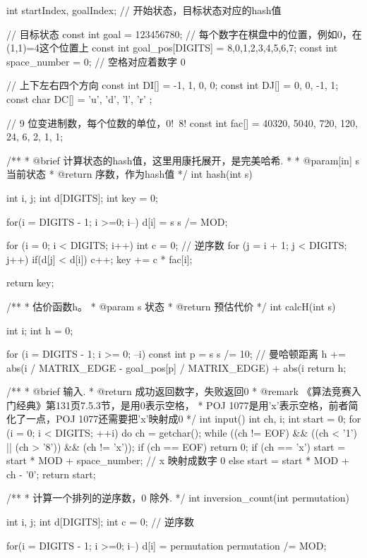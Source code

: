 \begin{Codex}[label=eight_digits_astar.c]
int  startIndex, goalIndex; // 开始状态，目标状态对应的hash值

// 目标状态
const int goal = 123456780;
// 每个数字在棋盘中的位置，例如0，在(1,1)=4这个位置上
const int goal_pos[DIGITS] = {8,0,1,2,3,4,5,6,7};
const int space_number = 0; // 空格对应着数字 0

// 上下左右四个方向
const int DI[] = {-1, 1, 0, 0};
const int DJ[] = {0, 0, -1, 1};
const char DC[] = { 'u', 'd', 'l', 'r' };

// 9 位变进制数，每个位数的单位，0!~8!
const int fac[] = {40320, 5040, 720, 120, 24, 6, 2, 1, 1};

/**
 * @brief 计算状态的hash值，这里用康托展开，是完美哈希.
 *
 * @param[in] s 当前状态
 * @return 序数，作为hash值
 */
int hash(int s) {
    int i, j;
    int d[DIGITS];
    int key = 0;

    for(i = DIGITS - 1; i >=0; i--) {
        d[i] = s %
        s /= MOD;
    }
    
    for (i = 0; i < DIGITS; i++) {
        int c = 0; // 逆序数
        for (j = i + 1; j < DIGITS; j++) {
            if(d[j] < d[i]) {
                c++;
            }
        }
        key += c * fac[i];
    }
    
    return key;
}


/**
 * 估价函数h。
 * @param s 状态
 * @return 预估代价
 */
int calcH(int s) {
    int i;
    int h = 0;
    
    for (i = DIGITS - 1; i >= 0; --i) {
        const int p = s %
        s /= 10;
        // 曼哈顿距离
        h += abs(i / MATRIX_EDGE - goal_pos[p] / MATRIX_EDGE) +
            abs(i %
    }
    return h;
}

/**
 * @brief 输入.
 * @return  成功返回数字，失败返回0
 * @remark 《算法竞赛入门经典》第131页7.5.3节，是用0表示空格，
 * POJ 1077是用'x'表示空格，前者简化了一点，POJ 1077还需要把'x'映射成0
 */
int input() {
    int ch, i;
    int start = 0;
    for (i = 0; i < DIGITS; ++i) {
        do {
            ch = getchar();
        } while ((ch != EOF) && ((ch < '1') || (ch > '8')) && (ch != 'x'));
        if (ch == EOF) return 0;
        if (ch == 'x') start = start * MOD + space_number; // x 映射成数字 0
        else             start = start * MOD + ch - '0';
    }
    return start;
}

/**
 * 计算一个排列的逆序数，0 除外.
 */
int inversion_count(int permutation) {
    int i, j;
    int d[DIGITS];
    int c = 0; // 逆序数

    for(i = DIGITS - 1; i >=0; i--) {
        d[i] = permutation %
        permutation /= MOD;
    }
    
}
\end{Codex}
